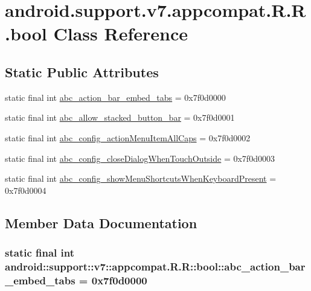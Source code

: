 \hypertarget{classandroid_1_1support_1_1v7_1_1appcompat_1_1_r_1_1bool}{
\section{android.support.v7.appcompat.R.R.bool Class Reference}
\label{classandroid_1_1support_1_1v7_1_1appcompat_1_1_r_1_1bool}
}
\subsection*{Static Public Attributes}
\begin{CompactItemize}
\item 
static final int \hyperlink{classandroid_1_1support_1_1v7_1_1appcompat_1_1_r_1_1bool_933f9bac1a249f3a1470a3ad3c2e7099}{abc\_\-action\_\-bar\_\-embed\_\-tabs} = 0x7f0d0000
\item 
static final int \hyperlink{classandroid_1_1support_1_1v7_1_1appcompat_1_1_r_1_1bool_d8ef25c7f7a1253cdec5ea846dc23b2b}{abc\_\-allow\_\-stacked\_\-button\_\-bar} = 0x7f0d0001
\item 
static final int \hyperlink{classandroid_1_1support_1_1v7_1_1appcompat_1_1_r_1_1bool_9beedfcbed71ce9c315cb906dbe5c62a}{abc\_\-config\_\-actionMenuItemAllCaps} = 0x7f0d0002
\item 
static final int \hyperlink{classandroid_1_1support_1_1v7_1_1appcompat_1_1_r_1_1bool_df0675334b1d0916b2ab1801598f7e32}{abc\_\-config\_\-closeDialogWhenTouchOutside} = 0x7f0d0003
\item 
static final int \hyperlink{classandroid_1_1support_1_1v7_1_1appcompat_1_1_r_1_1bool_6a9aa70356735de0302aaec8a0d55d3b}{abc\_\-config\_\-showMenuShortcutsWhenKeyboardPresent} = 0x7f0d0004
\end{CompactItemize}


\subsection{Member Data Documentation}
\hypertarget{classandroid_1_1support_1_1v7_1_1appcompat_1_1_r_1_1bool_933f9bac1a249f3a1470a3ad3c2e7099}{
\subsubsection[{abc\_\-action\_\-bar\_\-embed\_\-tabs}]{\setlength{\rightskip}{0pt plus 5cm}static final int android::support::v7::appcompat.R.R::bool::abc\_\-action\_\-bar\_\-embed\_\-tabs = 0x7f0d0000}}
\label{classandroid_1_1support_1_1v7_1_1appcompat_1_1_r_1_1bool_933f9bac1a249f3a1470a3ad3c2e7099}



